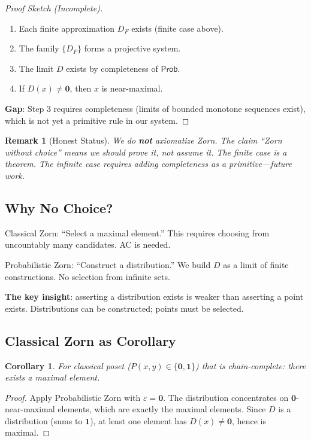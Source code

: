 \documentclass[11pt,a4paper]{article}
\newtheorem{corollary}[theorem]{Corollary}
\newtheorem{remark}[theorem]{Remark}
\newcommand{\Prob}{\mathsf{Prob}}
\newcommand{\pzero}{\mathbf{0}}
\newcommand{\pone}{\mathbf{1}}
\begin{document}
\begin{proof}[Proof Sketch (Incomplete)]
\begin{enumerate}
    \item Each finite approximation $D_F$ exists (finite case above).
    \item The family $\{D_F\}$ forms a projective system.
    \item The limit $D$ exists by completeness of $\Prob$.
    \item If $D(x) \neq \pzero$, then $x$ is near-maximal.
\end{enumerate}
\textbf{Gap}: Step 3 requires completeness (limits of bounded monotone sequences exist), which is not yet a primitive rule in our system.
\end{proof}

\begin{remark}[Honest Status]
We do \textbf{not} axiomatize Zorn. The claim ``Zorn without choice'' means we should \emph{prove} it, not assume it. The finite case is a theorem. The infinite case requires adding completeness as a primitive---future work.
\end{remark}

\subsection{Why No Choice?}

Classical Zorn: ``Select a maximal element.'' This requires choosing from uncountably many candidates. AC is needed.

Probabilistic Zorn: ``Construct a distribution.'' We build $D$ as a limit of finite constructions. No selection from infinite sets.

\textbf{The key insight}: asserting a distribution exists is weaker than asserting a point exists. Distributions can be constructed; points must be selected.

\subsection{Classical Zorn as Corollary}

\begin{corollary}
For classical poset ($P(x,y) \in \{\pzero, \pone\}$) that is chain-complete: there exists a maximal element.
\end{corollary}

\begin{proof}
Apply Probabilistic Zorn with $\varepsilon = \pzero$. The distribution concentrates on $\pzero$-near-maximal elements, which are exactly the maximal elements. Since $D$ is a distribution (sums to $\pone$), at least one element has $D(x) \neq \pzero$, hence is maximal.
\end{proof}
\end{document}
